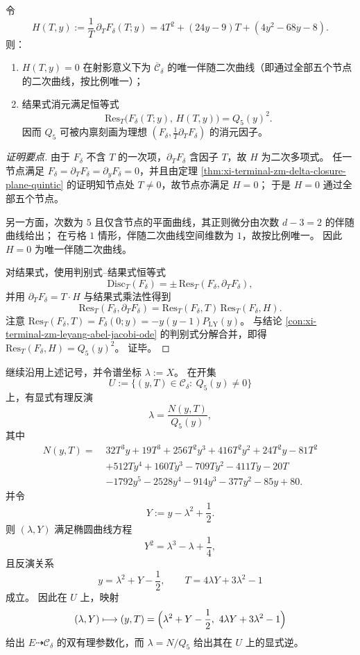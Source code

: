 \begin{proposition}\label{prop:xi-terminal-zm-delta-adjoint-conic-and-elimination}
令
\[
H(T,y):=\frac{1}{T}\,\partial_TF_\delta(T;y)=4T^{2}+(24y-9)T+(4y^{2}-68y-8).
\]
则：
\begin{enumerate}
  \item \(H(T,y)=0\) 在射影意义下为 \(\overline{\mathcal C}_\delta\) 的唯一伴随二次曲线（即通过全部五个节点的二次曲线，按比例唯一）；
  \item 结果式消元满足恒等式
  \[
  \mathrm{Res}_{T}\bigl(F_\delta(T;y),\,H(T,y)\bigr)=Q_{5}(y)^{2}.
  \]
  因而 \(Q_5\) 可被内禀刻画为理想 \((F_\delta,\frac{1}{T}\partial_TF_\delta)\) 的消元因子。
\end{enumerate}
\end{proposition}

\begin{proof}[证明要点]
由于 \(F_\delta\) 不含 \(T\) 的一次项，\(\partial_TF_\delta\) 含因子 \(T\)，故 \(H\) 为二次多项式。
任一节点满足 \(F_\delta=\partial_TF_\delta=\partial_yF_\delta=0\)，并且由定理 \ref{thm:xi-terminal-zm-delta-closure-plane-quintic} 的证明知节点处 \(T\neq 0\)，故节点亦满足 \(H=0\)；
于是 \(H=0\) 通过全部五个节点。

另一方面，次数为 \(5\) 且仅含节点的平面曲线，其正则微分由次数 \(d-3=2\) 的伴随曲线给出；
在亏格 \(1\) 情形，伴随二次曲线空间维数为 \(1\)，故按比例唯一。
因此 \(H=0\) 为唯一伴随二次曲线。

对结果式，使用判别式--结果式恒等式
\[
\mathrm{Disc}_{T}(F_\delta)=\pm\,\mathrm{Res}_{T}(F_\delta,\partial_TF_\delta),
\]
并用 \(\partial_TF_\delta=T\cdot H\) 与结果式乘法性得到
\[
\mathrm{Res}_{T}(F_\delta,\partial_TF_\delta)
=\mathrm{Res}_{T}(F_\delta,T)\,\mathrm{Res}_{T}(F_\delta,H).
\]
注意 \(\mathrm{Res}_{T}(F_\delta,T)=F_\delta(0;y)=-y(y-1)P_{\mathrm{LY}}(y)\)。
与结论 \ref{con:xi-terminal-zm-leyang-abel-jacobi-ode} 的判别式分解合并，即得
\(
\mathrm{Res}_{T}(F_\delta,H)=Q_5(y)^2
\)。
证毕。
\end{proof}

\begin{theorem}[谱坐标 \texorpdfstring{$\lambda=X$}{lambda=X} 的有理反演与极点除子]\label{thm:xi-terminal-zm-delta-spectral-x-inversion}
继续沿用上述记号，并令谱坐标 \(\lambda:=X\)。
在开集
\[
U:=\{(y,T)\in \mathcal C_\delta:\ Q_{5}(y)\neq 0\}
\]
上，有显式有理反演
\[
\lambda=\frac{N(y,T)}{Q_{5}(y)},
\]
其中
\[
\begin{aligned}
N(y,T)=\;&32T^{3}y+19T^{3}+256T^{2}y^{3}+416T^{2}y^{2}+24T^{2}y-81T^{2}\\
&+512Ty^{4}+160Ty^{3}-709Ty^{2}-411Ty-20T\\
&-1792y^{5}-2528y^{4}-914y^{3}-377y^{2}-85y+80.
\end{aligned}
\]
并令
\[
Y:=y-\lambda^{2}+\frac12.
\]
则 \((\lambda,Y)\) 满足椭圆曲线方程
\[
Y^{2}=\lambda^{3}-\lambda+\frac14,
\]
且反演关系
\[
y=\lambda^{2}+Y-\frac12,
\qquad
T=4\lambda Y+3\lambda^{2}-1
\]
成立。
因此在 \(U\) 上，映射
\[
(\lambda,Y)\longmapsto (y,T)=\Bigl(\lambda^{2}+Y-\frac12,\ 4\lambda Y+3\lambda^{2}-1\Bigr)
\]
给出 \(E\dashrightarrow\mathcal C_\delta\) 的双有理参数化，而 \(\lambda=N/Q_{5}\) 给出其在 \(U\) 上的显式逆。
\end{theorem}

